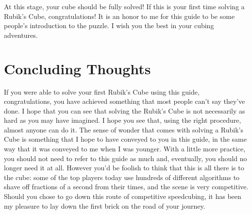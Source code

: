 \documentclass[12pt,letterpaper]{article}
\begin{document}
At this stage, your cube should be fully solved! If this is your first time
solving a Rubik's Cube, congratulations! It is an honor to me for this guide to
be some people's introduction to the puzzle. I wish you the best in your cubing
adventures.



\newpage

\section{Concluding Thoughts}

If you were able to solve your first Rubik's Cube using this guide,
congratulations, you have achieved something that most people can't say they've
done. I hope that you can see that solving the Rubik's Cube is not necessarily
as hard as you may have imagined. I hope you see that, using the right
procedure, almost anyone can do it. The sense of wonder that comes with solving
a Rubik's Cube is something that I hope to have conveyed to you in this guide,
in the same way that it was conveyed to me when I was younger. With a little
more practice, you should not need to refer to this guide as much and,
eventually, you should no longer need it at all. However you'd be foolish to
think that this is all there is to the cube: some of the top players today use
hundreds of different algorithms to shave off fractions of a second from their
times, and the scene is very competitive. Should you chose to go down this route
of competitive speedcubing, it has been my pleasure to lay down the first brick
on the road of your journey.
\end{document}
